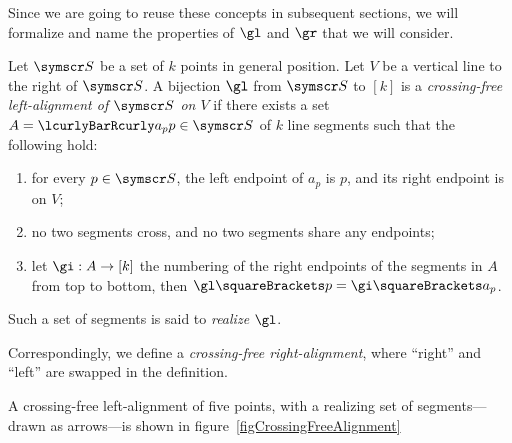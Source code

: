 \documentclass[10pt, a4paper, twoside]{basestyle}
\newcommand{\pointset}{\symscr}
\begin{document}
Since we are going to reuse these concepts in subsequent sections, we will formalize and name the properties of
$\gl$ and $\gr$ that we will consider.
\begin{definition}
Let ${\pointset S}$ be a set of $k$ points in general position. Let $V$ be a vertical line to the right of ${\pointset S}$.
A bijection $\gl$ from ${\pointset S}$ to $[k]$ is a \emph{crossing-free left-alignment of ${\pointset S}$ on $V$} if
there exists a set $A=\setst{a_p}{p\in{\pointset S}}$ of $k$ line segments such that
the following hold:
\begin{enumerate}
\item for every $p\in{\pointset S}$, the left endpoint of $a_p$ is $p$, and its right endpoint is on $V$;
\item no two segments cross, and no two segments share any endpoints;
\item let $\FunctionSpec \gi A {[k]}$ the numbering of the right endpoints of the segments in
$A$ from top to bottom, then $\gl\of p = \gi\of{a_p}$.
\end{enumerate}
Such a set of segments is said to \emph{realize} $\gl$.

Correspondingly, we define a \emph{crossing-free right-alignment}, where ``right'' and ``left'' are swapped in the
definition.
\end{definition}
A crossing-free left-alignment of five points, with a realizing set of segments---drawn as arrows---is shown in
figure~\ref{figCrossingFreeAlignment}
\end{document}
